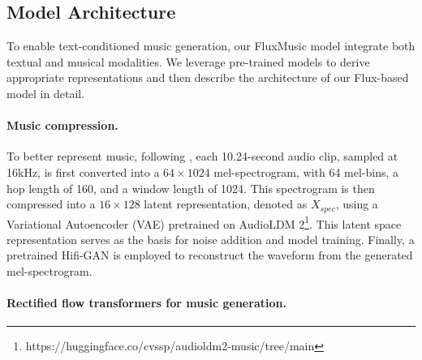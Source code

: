 \begin{table*}[t]
\centering
{}
\caption{\textbf{Scaling law of FluxMusic model size.} The model sizes and detailed hyperparameters settings for scaling experiments. 
}
\label{tab:scale}
\end{table*}

\subsection{Model Architecture}

To enable text-conditioned music generation, our FluxMusic model integrate both textual and musical modalities. We leverage pre-trained models to derive appropriate representations and then describe the architecture of our Flux-based model in detail. 

\paragraph{Music compression.}
To better represent music, following \cite{liu2024audioldm}, each 10.24-second audio clip, sampled at 16kHz, is first converted into a $64 \times 1024$ mel-spectrogram, with 64 mel-bins, a hop length of 160, and a window length of 1024. This spectrogram is then compressed into a $16 \times 128$ latent representation, denoted as $X_{spec}$, using a Variational Autoencoder (VAE) pretrained on AudioLDM 2\footnote{https://huggingface.co/cvssp/audioldm2-music/tree/main}. This latent space representation serves as the basis for noise addition and model training. Finally, a pretrained Hifi-GAN \cite{kong2020hifi} is employed to reconstruct the waveform from the generated mel-spectrogram.

\paragraph{Rectified flow transformers for music generation.}

